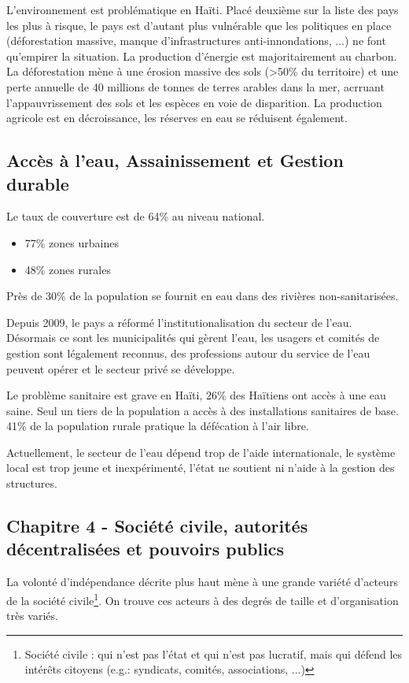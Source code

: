 \documentclass[a4paper, 11pt]{article}
\begin{document}
  L'environnement est problématique en Haïti. Placé deuxième sur la liste des pays les plus à risque, le pays est d'autant plus vulnérable que les politiques en place (déforestation massive, manque d'infrastructures anti-innondations, ...) ne font qu'empirer la situation. La production d'énergie est majoritairement au charbon.
  La déforestation mène à une érosion massive des sols (>50\% du territoire) et une perte annuelle de 40 millions de tonnes de terres arables dans la mer, acrruant l'appauvrissement des sols et les espèces en voie de disparition. La production agricole est en décroissance, les réserves en eau se réduisent également.

  \subsection*{Accès à l'eau, Assainissement et Gestion durable}
  Le taux de couverture est de 64\% au niveau national.
  \begin{itemize}
    \item 77\% zones urbaines
    \item 48\% zones rurales
  \end{itemize}
  Près de 30\% de la population se fournit en eau dans des rivières non-sanitarisées.

  Depuis 2009, le pays a réformé l'institutionalisation du secteur de l'eau. Désormais ce sont les municipalités qui gèrent l'eau, les usagers et comités de gestion sont légalement reconnus, des professions autour du service de l'eau peuvent opérer et le secteur privé se développe.

  Le problème sanitaire est grave en Haïti, 26\% des Haïtiens ont accès à une eau saine. Seul un tiers de la population a accès à des installations sanitaires de base. 41\% de la population rurale pratique la défécation à l'air libre.

  Actuellement, le secteur de l'eau dépend trop de l'aide internationale, le système local est trop jeune et inexpérimenté, l'état ne soutient ni n'aide à la gestion des structures.

  \subsection*{Chapitre 4 - Société civile, autorités décentralisées et pouvoirs publics}
  La volonté d'indépendance décrite plus haut mène à une grande variété d'acteurs de la société civile\footnote{Société civile : qui n'est pas l'état et qui n'est pas lucratif, mais qui défend les intérêts citoyens (e.g.: syndicats, comités, associations, ...)}. On trouve ces acteurs à des degrés de taille et d'organisation très variés.
\end{document}
